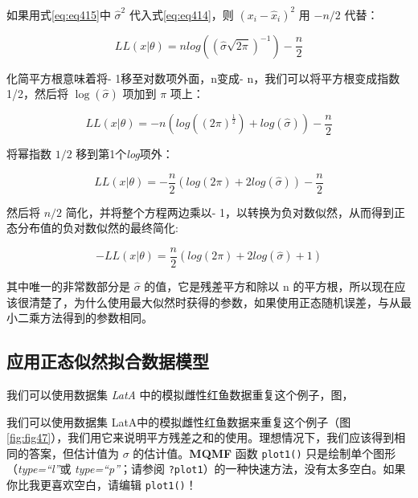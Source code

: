 \documentclass[
  lang=cn,
  11pt,
  scheme=chinese,
  chinesefont=nofont,
  citestyle=gb7714-2015,
  bibstyle=gb7714-2015]{elegantbook}
\begin{document}
如果用式\eqref{eq:eq415}中 \(\hat \sigma^2\) 代入式\eqref{eq:eq414}，则 \((x_i-\hat x_i)^2\) 用 \(-n/2\) 代替：

\begin{equation}  
LL(x|\theta)=n{log}\left( \left( {\hat{\sigma }\sqrt{2\pi }} \right)^{-1} \right) - \frac{n}{2}  
\label{eq:eq416}  
\end{equation}

化简平方根意味着将- 1移至对数项外面，n变成- n，我们可以将平方根变成指数1/2，然后将 \(\log(\hat \sigma)\) 项加到 \(\pi\) 项上：

\begin{equation}  
LL(x|\theta)=-n\left( {log}\left( {{\left( 2\pi  \right)}^{\frac{1}{2}}} \right)+{log}\left( {\hat{\sigma }} \right) \right)-\frac{n}{2}  
\label{eq:eq417}  
\end{equation}

将幂指数 \(1/2\) 移到第1个\emph{log}项外：

\begin{equation}  
LL(x|\theta)=-\frac{n}{2}\left( {log}\left( 2\pi  \right)+2{log}\left( {\hat{\sigma }} \right) \right)-\frac{n}{2}  
\label{eq:eq418}  
\end{equation}

然后将 \(n/2\) 简化，并将整个方程两边乘以- 1，以转换为负对数似然，从而得到正态分布值的负对数似然的最终简化:

\begin{equation}  
-LL(x|\theta)=\frac{n}{2}\left( {log}\left( 2\pi  \right) + 2{log} \left( {\hat{\sigma }} \right) + 1 \right)  
\label{eq:eq419}  
\end{equation}

其中唯一的非常数部分是 \(\hat \sigma\) 的值，它是残差平方和除以 n 的平方根，所以现在应该很清楚了，为什么使用最大似然时获得的参数，如果使用正态随机误差，与从最小二乘方法得到的参数相同。

\subsection{应用正态似然拟合数据模型}\label{ux5e94ux7528ux6b63ux6001ux4f3cux7136ux62dfux5408ux6570ux636eux6a21ux578b}

我们可以使用数据集 \emph{LatA} 中的模拟雌性红鱼数据重复这个例子，图，

我们可以使用数据集 LatA中的模拟雌性红鱼数据来重复这个例子（图 \ref{fig:fig47}），我们用它来说明平方残差之和的使用。理想情况下，我们应该得到相同的答案，但估计值为 \(\sigma\) 的估计值。\textbf{MQMF} 函数 \texttt{plot1()} 只是绘制单个图形（\emph{type=``l''}或 \emph{type=``p''}；请参阅 \texttt{?plot1}）的一种快速方法，没有太多空白。如果你比我更喜欢空白，请编辑 \texttt{plot1()}！
\end{document}
